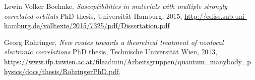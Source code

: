 \documentclass[a4paper,12pt]{article}
\begin{document}


\begin{thebibliography}{9}

    Lewin Volker Boehnke,
    \emph{Susceptibilities in materials with multiple strongly correlated orbitals}
    PhD thesis, Universit\"at Hamburg, 2015,
    \url{http://ediss.sub.uni-hamburg.de/volltexte/2015/7325/pdf/Dissertation.pdf}

    Georg Rohringer,
    \emph{New routes towards a theoretical treatment of nonlocal electronic correlations}
    PhD thesis, Technische Universit\"at Wien, 2013,
    \url{https://www.ifp.tuwien.ac.at/fileadmin/Arbeitsgruppen/quantum_manybody_physics/docs/thesis/RohringerPhD.pdf},

\end{thebibliography}
\end{document}
